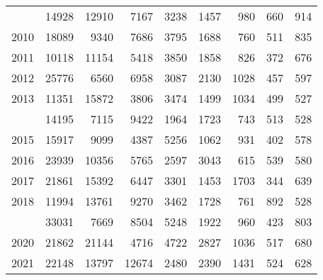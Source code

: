 \documentclass[
]{article}
\begin{document}
\begin{longtable}[t]{lrrrrrrrr}
\addlinespace
2009 & 14928 & 12910 & 7167 & 3238 & 1457 & 980 & 660 & 914\\
2010 & 18089 & 9340 & 7686 & 3795 & 1688 & 760 & 511 & 835\\
2011 & 10118 & 11154 & 5418 & 3850 & 1858 & 826 & 372 & 676\\
2012 & 25776 & 6560 & 6958 & 3087 & 2130 & 1028 & 457 & 597\\
2013 & 11351 & 15872 & 3806 & 3474 & 1499 & 1034 & 499 & 527\\
\addlinespace
2014 & 14195 & 7115 & 9422 & 1964 & 1723 & 743 & 513 & 528\\
2015 & 15917 & 9099 & 4387 & 5256 & 1062 & 931 & 402 & 578\\
2016 & 23939 & 10356 & 5765 & 2597 & 3043 & 615 & 539 & 580\\
2017 & 21861 & 15392 & 6447 & 3301 & 1453 & 1703 & 344 & 639\\
2018 & 11994 & 13761 & 9270 & 3462 & 1728 & 761 & 892 & 528\\
\addlinespace
2019 & 33031 & 7669 & 8504 & 5248 & 1922 & 960 & 423 & 803\\
2020 & 21862 & 21144 & 4716 & 4722 & 2827 & 1036 & 517 & 680\\
2021 & 22148 & 13797 & 12674 & 2480 & 2390 & 1431 & 524 & 628\\*
\end{longtable}
\end{document}
